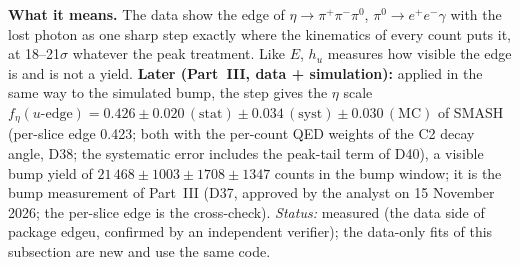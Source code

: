 \documentclass[11pt,a4paper]{article}
\newcommand{\piz}{\ensuremath{\pi^{0}}\xspace}
\newcommand{\ee}{\ensuremath{e^{+}e^{-}}\xspace}
\newcommand{\pipi}{\ensuremath{\pi^{+}\pi^{-}}\xspace}
\begin{document}
\textbf{What it means.} The data show the edge of $\eta\to\pipi\piz$, $\piz\to\ee\gamma$ with the lost photon as one sharp step exactly where
the kinematics of every count puts it, at 18--21$\sigma$ whatever the peak treatment. Like $E$, $h_u$ measures how visible the edge is and is
not a yield. \textbf{Later (Part~III, data + simulation):} applied in the same way to the simulated bump, the step gives the $\eta$ scale
$f_\eta(u\text{-edge})=0.426\pm0.020\,(\mathrm{stat})\pm0.034\,(\mathrm{syst})\pm0.030\,(\mathrm{MC})$ of SMASH (per-slice edge 0.423;
both with the per-count QED weights of the C2 decay angle, D38; the systematic error includes the peak-tail term of D40), a visible bump yield of
$21\,468\pm1003\pm1708\pm1347$ counts in the bump window; it is the bump measurement of Part~III (D37, approved by the analyst on
15 November 2026; the per-slice edge is the cross-check). \emph{Status:} measured (the data side of package edgeu, confirmed by an independent verifier); the
data-only fits of this subsection are new and use the same code.
\end{document}
